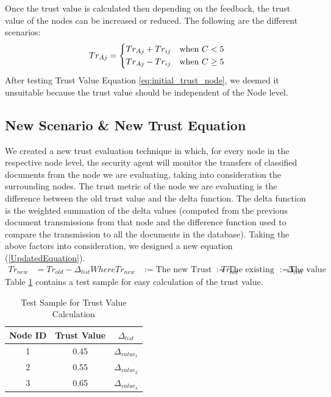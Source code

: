 Once the trust value is calculated then depending on the feedback, the trust
value of the nodes can be increased or reduced. The following are the different
scenarios: 
\begin{equation}
   Tr_{Aj} =    \begin{dcases*}
                    Tr_{Aj} + Tr_{ij} & when $C < 5$\\
                    Tr_{Aj} - Tr_{ij} & when $C \ge 5$
                \end{dcases*}
                \label{eq:initial_trust_node}
\end{equation}
After testing Trust Value Equation \ref{eq:initial_trust_node}, we deemed it unsuitable because the trust value should be independent of the Node level. 


\subsection{New Scenario \& New Trust Equation}
We created a new trust evaluation technique in which, for every node in the
respective node level, the security agent will monitor the transfers of
classified documents from the node we are evaluating, taking into consideration
the surrounding nodes. The trust metric of the node we are evaluating is the
difference between the old trust value and the delta function. The delta
function is the weighted summation of the delta values (computed from the
previous document transmissions from that node and the difference function used to
compare the transmission to all the documents in the database).  Taking the
above factors into consideration, we designed a new equation
(\ref{UpdatedEquation}).
\begin{equation}
    \label{UpdatedEquation}
    \begin{aligned}
        Tr_{new} &= Tr_{old} - \Delta_{list}
        Where Tr_{new} &:= \text{The new Trust value of the employee}
        Tr_{old} &:= \text{The existing trust value}
        \Delta_{list} &:= \text{The value obtained by combining input from the
        difference function and classification}
    \end{aligned}
\end{equation}
Table \ref{tab:trust_value_calculation} contains a test sample for easy calculation of the trust value.

\begin{table}[h!]
    \centering
    \begin{tabular}{c | c | c}
        \hline 
        Node ID & Trust Value & \(\Delta_{list}\) \\
        \hline \hline
        1 & 0.45 & \(\Delta_{value_1}\) \\
        2 & 0.55 & \(\Delta_{value_2}\) \\
        3 & 0.65 & \(\Delta_{value_3}\) \\
    \end{tabular}
    \caption{Test Sample for Trust Value Calculation}
    \label{tab:trust_value_calculation}
\end{table}

